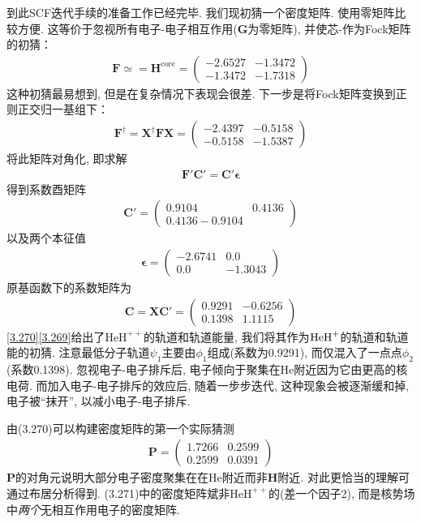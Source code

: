 到此SCF迭代手续的准备工作已经完毕. 
我们现初猜一个密度矩阵. 
使用零矩阵比较方便. 
这等价于忽视所有电子-电子相互作用($\mathbf{G}$为零矩阵), 
并使芯-\ha 作为Fock矩阵的初猜：
\begin{align}
	\mathbf{F}\simeq=\mathbf{H}^\mathrm{core}=
	\begin{pmatrix}
		-2.6527&-1.3472\\-1.3472&-1.7318
	\end{pmatrix}
\end{align}
这种初猜最易想到, 
但是在复杂情况下表现会很差. 
下一步是将Fock矩阵变换到正则正交归一基组下：
\begin{align}
	\mathbf{F^\dagger=X^\dagger FX}=
	\begin{pmatrix}
		-2.4397&-0.5158\\-0.5158&-1.5387
	\end{pmatrix}
\end{align}
将此矩阵对角化, 
即求解
\begin{align}
	\mathbf{F'C'=C'}{\boldsymbol\epsilon}
\end{align}
得到系数酉矩阵
\begin{align}
	\mathbf{C'}=
	\begin{pmatrix}
		0.9104&0.4136\\0.4136-0.9104
	\end{pmatrix}
\end{align}
以及两个本征值
\begin{align}
	\label{3.269}
	\bm{\epsilon}=
	\begin{pmatrix}
		-2.6741&0.0\\0.0&-1.3043
	\end{pmatrix}
\end{align}
原基函数下的系数矩阵为
\begin{align}
	\mathbf{C=XC'}=
	\begin{pmatrix}
		0.9291&-0.6256\\0.1398&1.1115
	\end{pmatrix}
	\label{3.270}
\end{align}
\autoref{3.270}\autoref{3.269}给出了$\mathrm{HeH}^{++}$的轨道和轨道能量, 
我们将其作为$\mathrm{HeH}^+$的轨道和轨道能的初猜. 
注意最低分子轨道$\psi_1$主要由$\phi_1$组成(系数为0.9291), 
而仅混入了一点点$\phi_2$(系数0.1398). 
忽视电子-电子排斥后, 
电子倾向于聚集在$\mathrm{He}$附近因为它由更高的核电荷. 
而加入电子-电子排斥的效应后, 
随着一步步迭代, 
这种现象会被逐渐缓和掉, 
电子被``抹开”, 
以减小电子-电子排斥.


由(3.270)可以构建密度矩阵的第一个实际猜测
\begin{align}
	\mathbf{P}=
	\begin{pmatrix}
		1.7266&0.2599\\0.2599&0.0391
	\end{pmatrix}
\end{align}
$\mathbf{P}$的对角元说明大部分电子密度聚集在在$\mathrm{He}$附近而非$\mathbf{H}$附近. 
对此更恰当的理解可通过布居分析得到. 
(3.271)中的密度矩阵斌非$\mathrm{HeH}^{++}$的(差一个因子2), 而是核势场中\emph{两个}无相互作用电子的密度矩阵.

